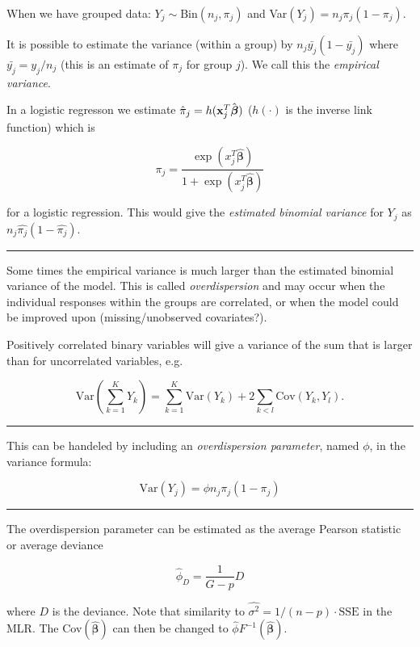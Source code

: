 \documentclass[
]{article}
\begin{document}
When we have grouped data: \(Y_j \sim \text{Bin} (n_j, \pi_j)\) and
Var\((Y_j) = n_j\pi_j(1-\pi_j)\).

It is possible to estimate the variance (within a group) by
\(n_j\bar{y_j}(1-\bar{y_j})\) where \(\bar{y_j} = y_j/n_j\) (this is an
estimate of \(\pi_j\) for group \(j\)). We call this the \emph{empirical
variance}.

In a logistic regresson we estimate
\(\hat{\pi}_j = h({\bf x}_j^T\hat{\boldsymbol{\beta}})\) (\(h(\cdot)\)
is the inverse link function) which is

\[\hat{\pi_j} = \frac{\exp(x_j^T \hat{\boldsymbol{\beta}})}{1+\exp(x_j^T \hat{\boldsymbol{\beta}})} \]

for a logistic regression. This would give the \emph{estimated binomial
variance} for \(Y_j\) as \(n_j\hat{\pi_j}(1-\hat{\pi_j})\).

\begin{center}\rule{0.5\linewidth}{0.5pt}\end{center}

Some times the empirical variance is much larger than the estimated
binomial variance of the model. This is called \emph{overdispersion} and
may occur when the individual responses within the groups are
correlated, or when the model could be improved upon (missing/unobserved
covariates?).

Positively correlated binary variables will give a variance of the sum
that is larger than for uncorrelated variables, e.g.

\[\text{Var}(\sum_{k=1}^K Y_k) = \sum_{k=1}^K\text{Var}(Y_k) + 2\sum_{k<l} \text{Cov}(Y_k, Y_l).\]

\begin{center}\rule{0.5\linewidth}{0.5pt}\end{center}

This can be handeled by including an \emph{overdispersion parameter},
named \(\phi\), in the variance formula:

\[ \text{Var}(Y_j) = \phi n_j \pi_j (1-\pi_j)\]

\begin{center}\rule{0.5\linewidth}{0.5pt}\end{center}

The overdispersion parameter can be estimated as the average Pearson
statistic or average deviance

\[\hat{\phi}_D = \frac{1}{G-p} D\]

where \(D\) is the deviance. Note that similarity to
\(\hat{\sigma^2} = 1/(n-p)\cdot\text{SSE}\) in the MLR. The
Cov\((\hat{\boldsymbol{\beta}})\) can then be changed to
\(\hat{\phi}F^{-1}(\hat{\boldsymbol{\beta}})\).
\end{document}
